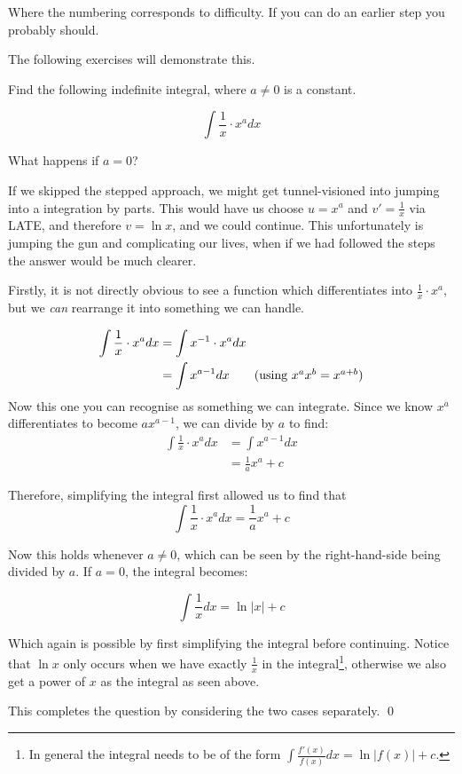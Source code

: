 Where the numbering corresponds to difficulty. If you can do an earlier step you probably should.

The following exercises will demonstrate this.


\begin{example}
    Find the following indefinite integral, where $a \neq0$ is a constant.

    \[\int \frac{1}{x}\cdot x^a dx\]

    What happens if $a = 0$?
\end{example}
\begin{solution}
    If we skipped the stepped approach, we might get tunnel-visioned into jumping into a integration by parts. This would 
    have us choose $u = x^a$ and $v' = \frac{1}{x}$ via LATE, and therefore $v = \ln x$, and we could continue. This unfortunately is jumping the gun 
    and complicating our lives, when if we had followed the steps the answer would be much clearer.

    Firstly, it is not directly obvious to see a function which differentiates into $\frac{1}{x}\cdot x^a$, but we \emph{can} rearrange it into something we can handle.

    \begin{align*}
        \int \frac{1}{x}\cdot x^a dx &=  \int x^{-1}\cdot x^a dx \\
         &= \int x^{a-1}dx \tag{using $x^ax^b = x^{a+b}$}
    \end{align*}
    Now this one you can recognise as something we can integrate. Since we know $x^{a}$ differentiates to become $ax^{a-1}$, we 
    can divide by $a$ to find:
     \begin{align*}
        \int \frac{1}{x}\cdot x^a dx &= \int x^{a-1}dx \\
        &= \frac{1}{a}x^a + c
    \end{align*}

    Therefore, simplifying the integral first allowed us to find that 
    \[\int \frac{1}{x}\cdot x^a dx = \frac{1}{a}x^a + c\]

    Now this holds whenever $a \neq 0$, which can be seen by the right-hand-side being divided by $a$. If $a=0$, the integral becomes:

    \[\int \frac{1}{x} dx = \ln |x|+ c\]

    Which again is possible by first simplifying the integral before continuing. Notice that $\ln x$ only occurs when we have exactly $\frac{1}{x}$ in the integral\footnote{In general the integral needs to be of the form $\int \frac{f'(x)}{f(x)}dx = \ln |f(x)| + c$.}, 
    otherwise we also get a power of $x$ as the integral as seen above.

    This completes the question by considering the two cases separately.
    \qed
\end{solution}

